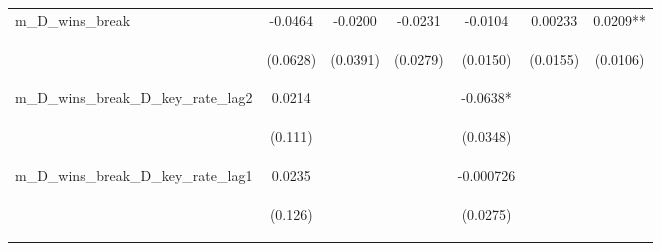 \begin{tabular}{lcccccc}
m\_D\_wins\_break & -0.0464 & -0.0200 & -0.0231 & -0.0104 & 0.00233 & 0.0209** \\
\vspace{4pt} & \begin{footnotesize}(0.0628)\end{footnotesize} & \begin{footnotesize}(0.0391)\end{footnotesize} & \begin{footnotesize}(0.0279)\end{footnotesize} & \begin{footnotesize}(0.0150)\end{footnotesize} & \begin{footnotesize}(0.0155)\end{footnotesize} & \begin{footnotesize}(0.0106)\end{footnotesize} \\
m\_D\_wins\_break\_D\_key\_rate\_lag2 & 0.0214 &  &  & -0.0638* &  &  \\
\vspace{4pt} & \begin{footnotesize}(0.111)\end{footnotesize} & \begin{footnotesize}\end{footnotesize} & \begin{footnotesize}\end{footnotesize} & \begin{footnotesize}(0.0348)\end{footnotesize} & \begin{footnotesize}\end{footnotesize} & \begin{footnotesize}\end{footnotesize} \\
m\_D\_wins\_break\_D\_key\_rate\_lag1 & 0.0235 &  &  & -0.000726 &  &  \\
\vspace{4pt} & \begin{footnotesize}(0.126)\end{footnotesize} & \begin{footnotesize}\end{footnotesize} & \begin{footnotesize}\end{footnotesize} & \begin{footnotesize}(0.0275)\end{footnotesize} & \begin{footnotesize}\end{footnotesize} & \begin{footnotesize}\end{footnotesize} \\

\end{tabular}
